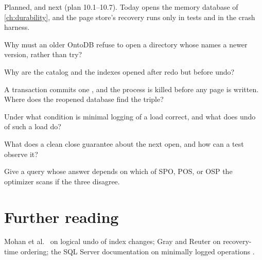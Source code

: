 \begin{status}
Planned, and next (plan 10.1--10.7). Today  opens the memory
database of \cref{ch:durability}, and the page store's recovery runs only in
tests and in the crash harness.
\end{status}

\begin{checkyourself}
\item Why must an older OntoDB refuse to open a directory whose  names a newer version, rather than try?
\item Why are the catalog and the indexes opened after redo but before undo?
\item A transaction commits one , and the process is killed before any page is written. Where does the reopened database find the triple?
\item Under what condition is minimal logging of a load correct, and what does undo of such a load do?
\item What does a clean close guarantee about the next open, and how can a test observe it?
\item Give a query whose answer depends on which of SPO, POS, or OSP the optimizer scans if the three disagree.
\end{checkyourself}

\section*{Further reading}
Mohan et al.\ \cite{aries} on logical undo of index changes; Gray and Reuter
\cite{grayreuter} on recovery-time ordering; the SQL Server documentation on
minimally logged operations \cite{sqlminimal}.
